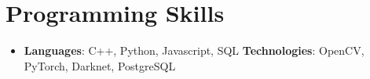 \documentclass[letterpaper,11pt]{article}
\newcommand{\resumeSubHeadingListStart}{\begin{itemize}[leftmargin=*]}
\newcommand{\resumeSubHeadingListEnd}{\end{itemize}}
\begin{document}
%
\section{Programming Skills}
 \resumeSubHeadingListStart
   \item{
     \textbf{Languages}{: C++, Python, Javascript, SQL}
     \hfill
     \textbf{Technologies}{:  OpenCV, PyTorch, Darknet, PostgreSQL}
   }
 \resumeSubHeadingListEnd


\end{document}
